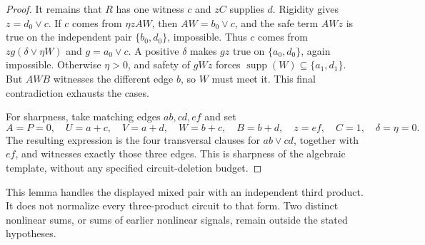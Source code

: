 \documentclass[11pt]{article}
\newcommand{\supp}{\operatorname{supp}}
\theoremstyle{definition}
\theoremstyle{remark}
\begin{document}
\begin{proof}
It remains that $R$ has one witness $c$ and $zC$ supplies $d$. Rigidity gives $z=d_0\vee c$. If $c$ comes from $\eta zAW$, then $AW=b_0\vee c$, and the safe term $AWz$ is true on the independent pair $\{b_0,d_0\}$, impossible. Thus $c$ comes from $zg(\delta\vee\eta W)$ and $g=a_0\vee c$. A positive $\delta$ makes $gz$ true on $\{a_0,d_0\}$, again impossible. Otherwise $\eta>0$, and safety of $gWz$ forces $\supp(W)\subseteq\{a_1,d_1\}$. But $AWB$ witnesses the different edge $b$, so $W$ must meet it. This final contradiction exhausts the cases.

For sharpness, take matching edges $ab,cd,ef$ and set
\[
 A=P=0,\quad U=a+c,\quad V=a+d,\quad W=b+c,
 \quad B=b+d,\quad z=ef,\quad C=1,\quad\delta=\eta=0.
\]
The resulting expression is the four transversal clauses for $ab\vee cd$, together with $ef$, and witnesses exactly those three edges. This is sharpness of the algebraic template, without any specified circuit-deletion budget.
\end{proof}

This lemma handles the displayed mixed pair with an independent third product. It does not normalize every three-product circuit to that form. Two distinct nonlinear sums, or sums of earlier nonlinear signals, remain outside the stated hypotheses.
\end{document}
